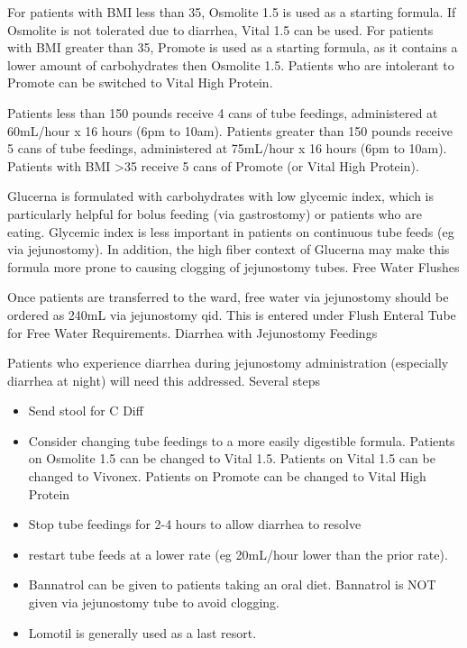\documentclass[
  letterpaper,
]{scrbook}
\providecommand{\tightlist}{%
  \setlength{\itemsep}{0pt}\setlength{\parskip}{0pt}}
\begin{document}
For patients with BMI less than 35, Osmolite 1.5 is used as a starting
formula. If Osmolite is not tolerated due to diarrhea, Vital 1.5 can be
used. For patients with BMI greater than 35, Promote is used as a
starting formula, as it contains a lower amount of carbohydrates then
Osmolite 1.5. Patients who are intolerant to Promote can be switched to
Vital High Protein.

Patients less than 150 pounds receive 4 cans of tube feedings,
administered at 60mL/hour x 16 hours (6pm to 10am). Patients greater
than 150 pounds receive 5 cans of tube feedings, administered at
75mL/hour x 16 hours (6pm to 10am). Patients with BMI \textgreater35
receive 5 cans of Promote (or Vital High Protein).

Glucerna is formulated with carbohydrates with low glycemic index, which
is particularly helpful for bolus feeding (via gastrostomy) or patients
who are eating. Glycemic index is less important in patients on
continuous tube feeds (eg via jejunostomy). In addition, the high fiber
context of Glucerna may make this formula more prone to causing clogging
of jejunostomy tubes. Free Water Flushes

Once patients are transferred to the ward, free water via jejunostomy
should be ordered as 240mL via jejunostomy qid. This is entered under
Flush Enteral Tube for Free Water Requirements. Diarrhea with
Jejunostomy Feedings

Patients who experience diarrhea during jejunostomy administration
(especially diarrhea at night) will need this addressed. Several steps

\begin{itemize}
\tightlist
\item
  Send stool for C Diff
\item
  Consider changing tube feedings to a more easily digestible formula.
  Patients on Osmolite 1.5 can be changed to Vital 1.5. Patients on
  Vital 1.5 can be changed to Vivonex. Patients on Promote can be
  changed to Vital High Protein
\item
  Stop tube feedings for 2-4 hours to allow diarrhea to resolve
\item
  restart tube feeds at a lower rate (eg 20mL/hour lower than the prior
  rate).
\item
  Bannatrol can be given to patients taking an oral diet. Bannatrol is
  NOT given via jejunostomy tube to avoid clogging.
\item
  Lomotil is generally used as a last resort.
\end{itemize}
\end{document}
